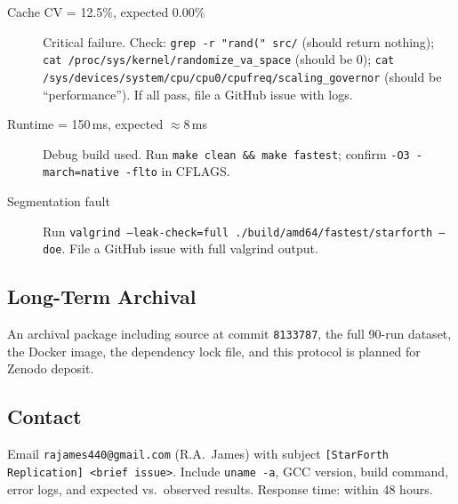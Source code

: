 \begin{description}
  \item[Cache CV = 12.5\%, expected 0.00\%] Critical failure. Check:
    \texttt{grep -r "rand(" src/} (should return nothing);
    \texttt{cat /proc/sys/kernel/randomize\_va\_space} (should be 0);
    \texttt{cat /sys/devices/system/cpu/cpu0/cpufreq/scaling\_governor}
    (should be ``performance''). If all pass, file a GitHub issue with logs.

  \item[Runtime = 150\,ms, expected ${\approx}$8\,ms] Debug build used.
    Run \texttt{make clean \&\& make fastest}; confirm \texttt{-O3
    -march=native -flto} in CFLAGS.

  \item[Segmentation fault] Run
    \texttt{valgrind --leak-check=full ./build/amd64/fastest/starforth --doe}.
    File a GitHub issue with full valgrind output.
\end{description}

\subsection{Long-Term Archival}

An archival package including source at commit \texttt{8133787}, the full
90-run dataset, the Docker image, the dependency lock file, and this protocol
is planned for Zenodo deposit.

\subsection{Contact}

Email \texttt{rajames440@gmail.com} (R.A.\ James) with subject
\texttt{[StarForth Replication] <brief issue>}. Include \texttt{uname -a},
GCC version, build command, error logs, and expected vs.\ observed results.
Response time: within 48 hours.
